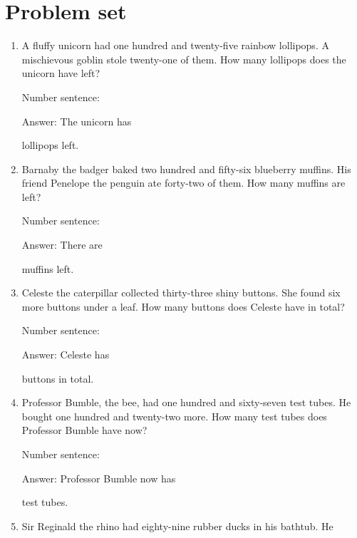 \documentclass{tufte-book}
\begin{document}
\clearpage\section{Problem set }

\begin{enumerate}

\item
  A fluffy unicorn had one hundred and twenty-five rainbow lollipops. A
  mischievous goblin stole twenty-one of them. How many lollipops does
  the unicorn have left?\medskip\par
  Number sentence:
  \dotfill\medskip\par
  Answer: The unicorn has
  \dotfill\medskip\par\mbox{}\dotfill\medskip\par\mbox{}\dotfill\bigskip
  lollipops left.
\item
  Barnaby the badger baked two hundred and fifty-six blueberry muffins.
  His friend Penelope the penguin ate forty-two of them. How many
  muffins are left?\medskip\par
  Number sentence:
  \dotfill\medskip\par
  Answer: There are
  \dotfill\medskip\par\mbox{}\dotfill\medskip\par\mbox{}\dotfill\bigskip
  muffins left.
\item
  Celeste the caterpillar collected thirty-three shiny buttons. She
  found six more buttons under a leaf. How many buttons does Celeste
  have in total?\medskip\par
  Number sentence:
  \dotfill\medskip\par
  Answer: Celeste has
  \dotfill\medskip\par\mbox{}\dotfill\medskip\par\mbox{}\dotfill\bigskip
  buttons in total.
\item
  Professor Bumble, the bee, had one hundred and sixty-seven test tubes.
  He bought one hundred and twenty-two more. How many test tubes does
  Professor Bumble have now?\medskip\par
  Number sentence:
  \dotfill\medskip\par
  Answer: Professor Bumble now has
  \dotfill\medskip\par\mbox{}\dotfill\medskip\par\mbox{}\dotfill\bigskip
  test tubes.
\item
  Sir Reginald the rhino had eighty-nine rubber ducks in his bathtub. He

\end{enumerate}
\end{document}
